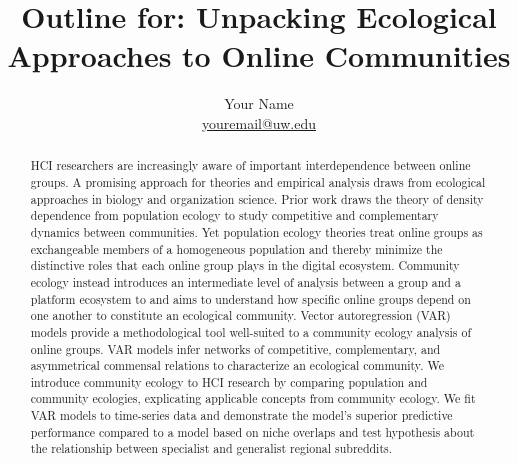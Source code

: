 \documentclass[12pt]{memoir}
\begin{document}
\renewcommand{\arraystretch}{2}
\setlength{\parskip}{4.5pt}

\baselineskip 16pt

\title{Outline for: Unpacking Ecological Approaches to Online Communities }
\author{Your Name\\
        \href{mailto:youremail@uw.edu}{youremail@uw.edu}}
\date{}

\published{\textsc{\textcolor{BrickRed}{This document is an
  unpublished draft.\\ Please do not distribute or cite without
  permission.}}}

\maketitle

\begin{abstract}
  HCI researchers are increasingly aware of important interdependence between online groups. A promising approach for theories and empirical analysis draws from ecological approaches in biology and organization science. Prior work draws the theory of density dependence from population ecology to study competitive and complementary dynamics between communities.  Yet population ecology theories treat online groups as exchangeable members of a homogeneous population and thereby minimize the distinctive roles that each online group plays in the digital ecosystem.  Community ecology instead introduces an intermediate level of analysis between a group and a platform ecosystem to and aims to understand how specific online groups depend on one another to constitute an ecological community.   Vector autoregression (VAR) models provide a methodological tool well-suited to a community ecology analysis of online groups. VAR models infer networks of competitive, complementary, and asymmetrical commensal relations to characterize an ecological community.  We introduce community ecology to HCI research by comparing population and community ecologies, explicating applicable concepts from community ecology. We fit VAR models to time-series data and demonstrate the model's superior predictive performance compared to a model based on niche overlaps and test hypothesis about the relationship between specialist and generalist regional subreddits.
\end{abstract}
\end{document}
